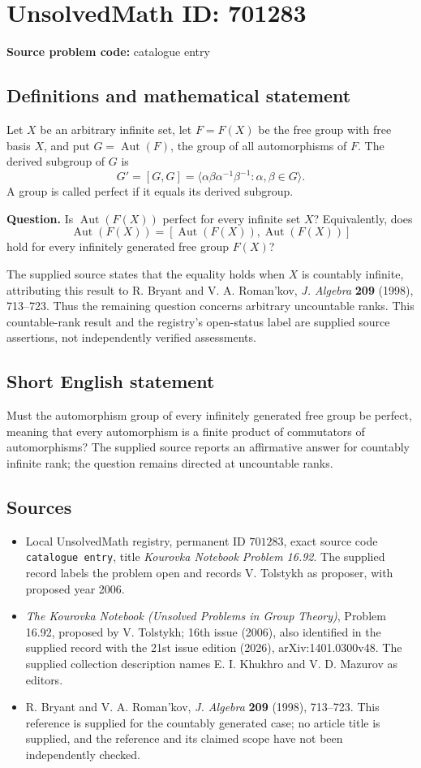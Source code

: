 \documentclass[11pt]{article}
\begin{document}
\section*{UnsolvedMath ID: 701283}
\textbf{Source problem code:} catalogue entry
\subsection{Definitions and mathematical statement}
Let \(X\) be an arbitrary infinite set, let \(F=F(X)\) be the free group with free basis \(X\), and put \(G=\operatorname{Aut}(F)\), the group of all automorphisms of \(F\). The derived subgroup of \(G\) is
\[
G'=[G,G]=\bigl\langle \alpha\beta\alpha^{-1}\beta^{-1}:\alpha,\beta\in G\bigr\rangle.
\]
A group is called perfect if it equals its derived subgroup.

\textbf{Question.} Is \(\operatorname{Aut}(F(X))\) perfect for every infinite set \(X\)? Equivalently, does
\[
\operatorname{Aut}(F(X))=[\operatorname{Aut}(F(X)),\operatorname{Aut}(F(X))]
\]
hold for every infinitely generated free group \(F(X)\)?

The supplied source states that the equality holds when \(X\) is countably infinite, attributing this result to R. Bryant and V. A. Roman'kov, \emph{J. Algebra} \textbf{209} (1998), 713--723. Thus the remaining question concerns arbitrary uncountable ranks. This countable-rank result and the registry's open-status label are supplied source assertions, not independently verified assessments.
\subsection{Short English statement}
Must the automorphism group of every infinitely generated free group be perfect, meaning that every automorphism is a finite product of commutators of automorphisms? The supplied source reports an affirmative answer for countably infinite rank; the question remains directed at uncountable ranks.
\subsection{Sources}
\begin{itemize}
\item Local UnsolvedMath registry, permanent ID \(701283\), exact source code \texttt{catalogue entry}, title \emph{Kourovka Notebook Problem 16.92}. The supplied record labels the problem open and records V. Tolstykh as proposer, with proposed year 2006.
\item \emph{The Kourovka Notebook (Unsolved Problems in Group Theory)}, Problem 16.92, proposed by V. Tolstykh; 16th issue (2006), also identified in the supplied record with the 21st issue edition (2026), arXiv:1401.0300v48. The supplied collection description names E. I. Khukhro and V. D. Mazurov as editors.
\item R. Bryant and V. A. Roman'kov, \emph{J. Algebra} \textbf{209} (1998), 713--723. This reference is supplied for the countably generated case; no article title is supplied, and the reference and its claimed scope have not been independently checked.
\end{itemize}
\end{document}
